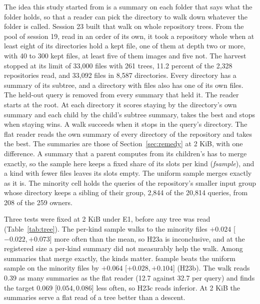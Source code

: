 \documentclass[11pt]{article}
\newcommand{\ci}[2]{[\ensuremath{#1},\,\ensuremath{#2}]}  %
\begin{document}
The idea this study started from is a summary on each folder that says what the folder holds, so that a reader can pick the directory to walk down whatever the folder is called. Session 23 built that walk on whole repository trees. From the pool of session 19, read in an order of its own, it took a repository whole when at least eight of its directories hold a kept file, one of them at depth two or more, with 40 to 300 kept files, at least five of them images and five not. The harvest stopped at its limit of 33,000 files with 261 trees, 11.2 percent of the 2,328 repositories read, and 33,092 files in 8,587 directories. Every directory has a summary of its subtree, and a directory with files also has one of its own files. The held-out query is removed from every summary that held it. The reader starts at the root. At each directory it scores staying by the directory's own summary and each child by the child's subtree summary, takes the best and stops when staying wins. A walk succeeds when it stops in the query's directory. The flat reader reads the own summary of every directory of the repository and takes the best. The summaries are those of Section~\ref{sec:remedy} at 2 KiB, with one difference. A summary that a parent computes from its children's has to merge exactly, so the sample here keeps a fixed share of its slots per kind (\emph{fsample}), and a kind with fewer files leaves its slots empty. The uniform sample merges exactly as it is. The minority cell holds the queries of the repository's smaller input group whose directory keeps a sibling of their group, 2,844 of the 20,814 queries, from 208 of the 259 owners.

Three tests were fixed at 2 KiB under E1, before any tree was read (Table~\ref{tab:tree}). The per-kind sample walks to the minority files $+0.024$ \ci{-0.022}{+0.073} more often than the mean, so H23a is inconclusive, and at the registered size a per-kind summary did not measurably help the walk. Among summaries that merge exactly, the kinds matter. fsample beats the uniform sample on the minority files by $+0.064$ \ci{+0.028}{+0.104} (H23b). The walk reads 0.39 as many summaries as the flat reader (12.7 against 32.7 per query) and finds the target 0.069 \ci{0.054}{0.086} less often, so H23c reads inferior. At 2 KiB the summaries serve a flat read of a tree better than a descent.
\end{document}
